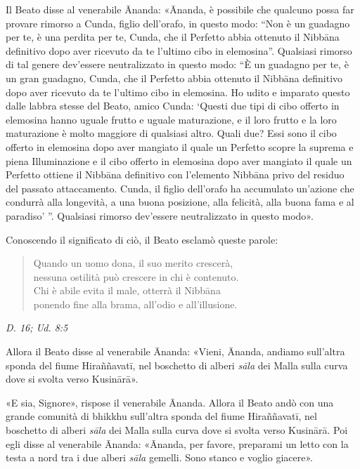 Il Beato disse al venerabile Ānanda: «Ānanda, è possibile che qualcuno
possa far provare rimorso a Cunda, figlio dell’orafo, in questo modo:
“Non è un guadagno per te, è una perdita per te, Cunda, che il Perfetto
abbia ottenuto il Nibbāna definitivo dopo aver ricevuto da te l’ultimo
cibo in elemosina”. Qualsiasi rimorso di tal genere dev’essere
neutralizzato in questo modo: “È un guadagno per te, è un gran guadagno,
Cunda, che il Perfetto abbia ottenuto il Nibbāna definitivo dopo aver
ricevuto da te l’ultimo cibo in elemosina. Ho udito e imparato questo
dalle labbra stesse del Beato, amico Cunda: ‘Questi due tipi di cibo
offerto in elemosina hanno uguale frutto e uguale maturazione, e il loro
frutto e la loro maturazione è molto maggiore di qualsiasi altro. Quali
due? Essi sono il cibo offerto in elemosina dopo aver mangiato il quale
un Perfetto scopre la suprema e piena Illuminazione e il cibo offerto in
elemosina dopo aver mangiato il quale un Perfetto ottiene il Nibbāna
definitivo con l’elemento Nibbāna privo del residuo del passato
attaccamento. Cunda, il figlio dell’orafo ha accumulato un’azione che
condurrà alla longevità, a una buona posizione, alla felicità, alla
buona fama e al paradiso’ ”. Qualsiasi rimorso dev’essere neutralizzato
in questo modo».


Conoscendo il significato di ciò, il Beato esclamò queste parole:


\begin{quotation}
Quando un uomo dona, il suo merito crescerà, \\
nessuna ostilità può crescere in chi è contenuto. \\
Chi è abile evita il male, otterrà il Nibbāna \\
ponendo fine alla brama, all’odio e all’illusione.
\end{quotation}

\emph{D. 16; Ud. 8:5}


Allora il Beato disse al venerabile Ānanda: «Vieni, Ānanda, andiamo
sull’altra sponda del fiume Hiraññavatī, nel boschetto di alberi \emph{sāla}
dei Malla sulla curva dove si svolta verso Kusinārā».


«E sia, Signore», rispose il venerabile Ānanda. Allora il Beato andò con
una grande comunità di bhikkhu sull’altra sponda del fiume Hiraññavatī,
nel boschetto di alberi \emph{sāla} dei Malla sulla curva dove si svolta
verso Kusinārā. Poi egli disse al venerabile Ānanda: «Ānanda, per
favore, preparami un letto con la testa a nord tra i due alberi \emph{sāla}
gemelli. Sono stanco e voglio giacere».


